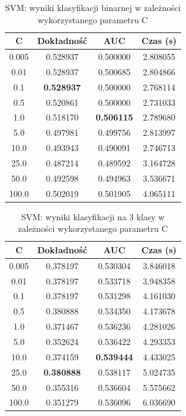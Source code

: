 \documentclass[a4paper, twoside, 11pt, openright]{article}
\begin{document}
\begin{table}[H]
    \centering
    \begin{tabular}{|c|c|c|c|}
    \hline
        \textbf{C} & \textbf{Dokładność} & \textbf{AUC} & \textbf{Czas (s)} \\ \hline
0.005 &  0.528937 &  0.500000 &    2.808055 \\ \hline
0.01  &  0.528937 &  0.500685 &    2.804866 \\ \hline
0.1   &  \textbf{0.528937} &  0.500000 &    2.768114 \\ \hline
0.5   &  0.520861 &  0.500000 &    2.731033 \\ \hline
1.0   &  0.518170 &  \textbf{0.506115} &    2.789680 \\ \hline
5.0   &  0.497981 &  0.499756 &    2.813997 \\ \hline
10.0  &  0.493943 &  0.490091 &    2.746713 \\ \hline
25.0  &  0.487214 &  0.489592 &    3.164728 \\ \hline
50.0  &  0.492598 &  0.494963 &    3.536671 \\ \hline
100.0 &  0.502019 &  0.501905 &    4.065111 \\ \hline

    \end{tabular}
    \caption{SVM: wyniki klasyfikacji binarnej w zależności wykorzystanego parametru C}
    \label{tab:svm_c_binary}
\end{table}


\begin{table}[H]
    \centering
    \begin{tabular}{|c|c|c|c|}
    \hline
        \textbf{C} & \textbf{Dokładność} & \textbf{AUC} & \textbf{Czas (s)} \\ \hline
0.005 &  0.378197 &  0.530304 &    3.846018 \\ \hline
0.01  &  0.378197 &  0.533718 &    3.948358 \\ \hline
0.1   &  0.378197 &  0.531298 &    4.161030 \\ \hline
0.5   &  0.380888 &  0.534350 &    4.173678 \\ \hline
1.0   &  0.371467 &  0.536236 &    4.281026 \\ \hline
5.0   &  0.352624 &  0.536422 &    4.293353 \\ \hline
10.0  &  0.374159 &  \textbf{0.539444} &    4.433025 \\ \hline
25.0  &  \textbf{0.380888} &  0.538117 &    5.024735 \\ \hline
50.0  &  0.355316 &  0.536604 &    5.575662 \\ \hline
100.0 &  0.351279 &  0.536096 &    6.036690 \\ \hline
    \end{tabular}
    \caption{SVM: wyniki klasyfikacji na 3 klasy w zależności wykorzystanego parametru C}
    \label{tab:svm_c_discrete}
\end{table}
\end{document}
